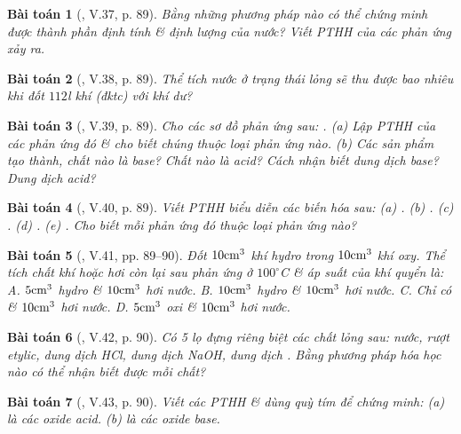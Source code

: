 \documentclass{article}
\newtheorem{baitoan}{Bài toán}
\begin{document}
\begin{baitoan}[\cite{Truong_BTNC_Hoa_Hoc_8_2022}, V.37, p. 89]
	Bằng những phương pháp nào có thể chứng minh được thành phần định tính \& định lượng của nước? Viết PTHH của các phản ứng xảy ra.
\end{baitoan}

\begin{baitoan}[\cite{Truong_BTNC_Hoa_Hoc_8_2022}, V.38, p. 89]
	Thể tích nước ở trạng thái lỏng sẽ thu được bao nhiêu khi đốt $112$\emph{l} khí \emph{} (đktc) với khí \emph{} dư?
\end{baitoan}

\begin{baitoan}[\cite{Truong_BTNC_Hoa_Hoc_8_2022}, V.39, p. 89]
	Cho các sơ đồ phản ứng sau: \emph{}. (a) Lập PTHH của các phản ứng đó \& cho biết chúng thuộc loại phản ứng nào. (b) Các sản phẩm tạo thành, chất nào là base? Chất nào là acid? Cách nhận biết dung dịch base? Dung dịch acid?
\end{baitoan}

\begin{baitoan}[\cite{Truong_BTNC_Hoa_Hoc_8_2022}, V.40, p. 89]
	Viết PTHH biểu diễn các biến hóa sau: (a) \emph{}. (b) \emph{}. (c) \emph{}. (d) \emph{}. (e) \emph{}. Cho biết mỗi phản ứng đó thuộc loại phản ứng nào?
\end{baitoan}

\begin{baitoan}[\cite{Truong_BTNC_Hoa_Hoc_8_2022}, V.41, pp. 89--90]
	Đốt $\rm10cm^3$ khí hydro trong $\rm10cm^3$ khí oxy. Thể tích chất khí hoặc hơi còn lại sau phản ứng ở $100^\circ$C \& áp suất của khí quyển là: {\sf A.} $\rm5cm^3$ hydro \& $\rm10cm^3$ hơi nước. {\sf B.} $\rm10cm^3$ hydro \& $\rm10cm^3$ hơi nước. {\sf C.} Chỉ có \& $\rm10cm^3$ hơi nước. {\sf D.} $\rm5cm^3$ oxi \& $\rm10cm^3$ hơi nước. 
\end{baitoan}

\begin{baitoan}[\cite{Truong_BTNC_Hoa_Hoc_8_2022}, V.42, p. 90]
	Có 5 lọ đựng riêng biệt các chất lỏng sau: nước, rượt etylic, dung dịch \emph{HCl}, dung dịch \emph{NaOH}, dung dịch \emph{}. Bằng phương pháp hóa học nào có thể nhận biết được mỗi chất?
\end{baitoan}

\begin{baitoan}[\cite{Truong_BTNC_Hoa_Hoc_8_2022}, V.43, p. 90]
	Viết các PTHH \& dùng quỳ tím để chứng minh: (a) \emph{} là các oxide acid. (b) \emph{} là các oxide base.
\end{baitoan}
\end{document}
